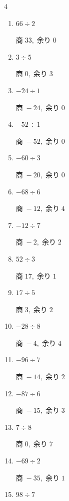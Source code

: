 \begin{multicols}{4}
\begin{enumerate}
  \item $66 \div 2$

        $商\; 33,\; 余り\; 0$

  \item $3 \div 5$

        $商\; 0,\; 余り\; 3$

  \item $-24 \div 1$

        $商\; -24,\; 余り\; 0$

  \item $-52 \div 1$

        $商\; -52,\; 余り\; 0$

\columnbreak %

\resetques

  \item $-60 \div 3$

        $商\; -20,\; 余り\; 0$

  \item $-68 \div 6$

        $商\; -12,\; 余り\; 4$

  \item $-12 \div 7$

        $商\; -2,\; 余り\; 2$

  \item $52 \div 3$

        $商\; 17,\; 余り\; 1$

  \item $17 \div 5$

        $商\; 3,\; 余り\; 2$

  \item $-28 \div 8$

        $商\; -4,\; 余り\; 4$

  \item $-96 \div 7$

        $商\; -14,\; 余り\; 2$

  \item $-87 \div 6$

        $商\; -15,\; 余り\; 3$

  \item $7 \div 8$

        $商\; 0,\; 余り\; 7$

  \item $-69 \div 2$

        $商\; -35,\; 余り\; 1$

  \item $98 \div 7$


\end{enumerate}
\end{multicols}
